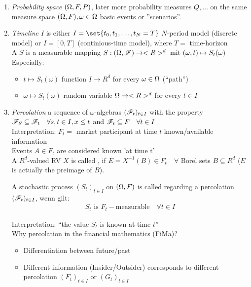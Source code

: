 \begin{enumerate}
	\item \emph{Probability space} $(\Omega,F,P)$, later more probability measures $Q, \dots$ on the same measure space $(\Omega,F), \omega \in \Omega$ basic events or ''scenarios''.
	\item \emph{Timeline} $I$ is either $I=\set{t_0, t_1, \dots, t_N=T}$ $N$-period model (discrete model) or $I = [0,T]$ (continious-time model), where $T = $ time-horizon\\
	A  $S$ is a measurable mapping $S: (\Omega,\mathscr F) \to <R>^d \text{ mit } (\omega, t) \mapsto S_t(\omega)$\\
	Especially:
	\begin{itemize}
		\item $t \mapsto S_t(\omega)$ function $I \to R^d$ for every $\omega \in \Omega$ (``path'')
		\item $\omega \mapsto S_t(\omega)$ random variable $\Omega \to <R>^d$ for every $t \in I$
	\end{itemize}
	\item \emph{Percolation} 
	a sequence of $\omega$-algebras $(\mathscr F_t)_{t \in I}$ with the property $\mathscr F_S \subseteq \mathscr F_t \quad \forall s,t \in I, x \le t$ and $\mathscr F_t \subseteq F\quad \forall t \in I$\\
	Interpretation: $F_t=$ market participant at time $t$ known/available information\\
	Events $A \in F_t$ are considered known 'at time t'\\
	A $R^d$-valued RV $X$ is called  , if $E = X^{-1}(B) \in F_t \quad \forall$ Borel sets $B \subseteq R^d$ ($E$ is actually the preimage of $B$).
	\begin{*example}
		A stochastic process  $(S_t)_{t\in I}$ on $(\Omega,F)$ is called  regarding a percolation $(\mathscr F_t)_{t \in I}$, wenn gilt:
		\begin{align*}
			S_t \text{ is } F_t-\text{measurable} \quad \forall t \in I
		\end{align*}
	\end{*example}
	Interpretation: ``the value $S_t$ is known at time $t$''\\
	Why percolation in the financial mathematics (FiMa)?
	\begin{itemize}
		\item Differentiation between future/past
		\item Different information (Insider/Outsider) corresponds to different percolation $(F_t)_{t \in I}$ or $(G_t)_{t\in I}$

\end{itemize}
\end{enumerate}
